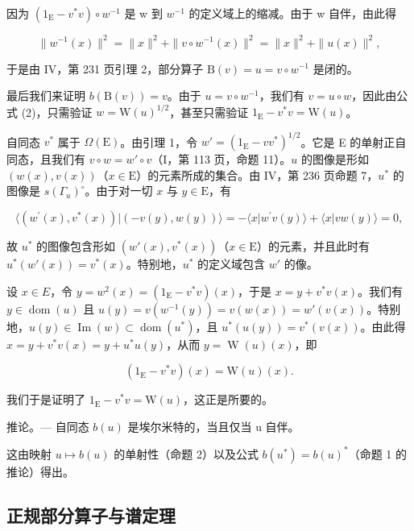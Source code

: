 因为 \((1_{\mathrm{E}} - v^{*}v) \circ w^{-1}\) 是 w 到 \(w^{-1}\) 的定义域上的缩减。由于 w 自伴，由此得

\[
\| w ^ {- 1} (x) \| ^ {2} = \| x \| ^ {2} + \| v \circ w ^ {- 1} (x) \| ^ {2} = \| x \| ^ {2} + \| u (x) \| ^ {2},
\]

于是由 IV，第 231 页引理 2，部分算子 \(\mathrm{B}(v) = u = v \circ w^{-1}\) 是闭的。

最后我们来证明 \(b(\mathrm{B}(v)) = v\)。由于 \(u = v \circ w^{-1}\)，我们有 \(v = u \circ w\)，因此由公式 (2)，只需验证 \(w = \mathrm{W}(u)^{1/2}\)，甚至只需验证 \(1_{\mathrm{E}} - v^{*}v = \mathrm{W}(u)\)。

自同态 \(v^*\) 属于 \(\Omega(\mathrm{E})\)。由引理 1，令 \(w' = (1_{\mathrm{E}} - vv^{*})^{1/2}\)。它是 E 的单射正自同态，且我们有 \(v \circ w = w' \circ v\)（I，第 113 页，命题 11）。\(u\) 的图像是形如 \((w(x), v(x))\)（\(x \in \mathrm{E}\)）的元素所成的集合。由 IV，第 236 页命题 7，\(u^*\) 的图像是 \(s(\Gamma_u)^{\circ}\)。由于对一切 \(x\) 与 \(y \in \mathrm{E}\)，有

\[
\langle (w ^ {\prime} (x), v ^ {*} (x)) | (- v (y), w (y)) \rangle = - \langle x | w ^ {\prime} v (y) \rangle + \langle x | v w (y) \rangle = 0,
\]

故 \(u^*\) 的图像包含形如 \((w'(x), v^*(x))\)（\(x \in \mathrm{E}\)）的元素，并且此时有 \(u^*(w'(x)) = v^*(x)\)。特别地，\(u^*\) 的定义域包含 \(w'\) 的像。

设 \(x \in E\)，令 \(y = w^{2}(x) = (1_{\mathrm{E}} - v^{*}v)(x)\)，于是 \(x = y + v^{*}v(x)\)。我们有 \(y \in \operatorname{dom}(u)\) 且 \(u(y) = v(w^{-1}(y)) = v(w(x)) = w'(v(x))\)。特别地，\(u(y) \in \operatorname{Im}(w) \subset \operatorname{dom}(u^{*})\)，且 \(u^{*}(u(y)) = v^{*}(v(x))\)。由此得 \(x = y + v^{*}v(x) = y + u^{*}u(y)\)，从而 \(y = \operatorname{W}(u)(x)\)，即

\[
(1 _ {\mathrm{E}} - v ^ {*} v) (x) = \mathrm{W} (u) (x).
\]

我们于是证明了 \(1_{\mathrm{E}} - v^{*}v = \mathrm{W}(u)\)，这正是所要的。

推论。--- 自同态 \(b(u)\) 是埃尔米特的，当且仅当 u 自伴。

这由映射 \(u \mapsto b(u)\) 的单射性（命题 2）以及公式 \(b(u^{*}) = b(u)^{*}\)（命题 1 的推论）得出。

\subsection{正规部分算子与谱定理}

